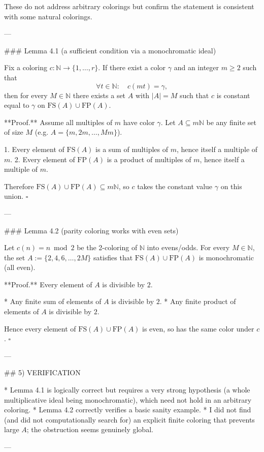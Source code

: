 These do not address arbitrary colorings but confirm the statement is consistent with some natural colorings.

---

### Lemma 4.1 (a sufficient condition via a monochromatic ideal)

Fix a coloring $c:\mathbb N\to\{1,\dots,r\}$.
If there exist a color $\gamma$ and an integer $m\ge 2$ such that
\[
\forall t\in\mathbb N:\quad c(mt)=\gamma,
\]
then for every $M\in\mathbb N$ there exists a set $A$ with $|A|=M$ such that $c$ is constant equal to $\gamma$ on $\mathrm{FS}(A)\cup\mathrm{FP}(A)$.

**Proof.**
Assume all multiples of $m$ have color $\gamma$.
Let $A\subseteq m\mathbb N$ be any finite set of size $M$ (e.g. $A=\{m,2m,\dots,Mm\}$).

1. Every element of $\mathrm{FS}(A)$ is a sum of multiples of $m$, hence itself a multiple of $m$.
2. Every element of $\mathrm{FP}(A)$ is a product of multiples of $m$, hence itself a multiple of $m$.

Therefore $\mathrm{FS}(A)\cup\mathrm{FP}(A)\subseteq m\mathbb N$, so $c$ takes the constant value $\gamma$ on this union.
$\square$

---

### Lemma 4.2 (parity coloring works with even sets)

Let $c(n)=n\bmod 2$ be the 2-coloring of $\mathbb N$ into evens/odds.
For every $M\in\mathbb N$, the set $A:=\{2,4,6,\dots,2M\}$ satisfies that $\mathrm{FS}(A)\cup\mathrm{FP}(A)$ is monochromatic (all even).

**Proof.**
Every element of $A$ is divisible by $2$.

* Any finite sum of elements of $A$ is divisible by $2$.
* Any finite product of elements of $A$ is divisible by $2$.

Hence every element of $\mathrm{FS}(A)\cup\mathrm{FP}(A)$ is even, so has the same color under $c$.
$\square$

---

## 5) VERIFICATION

* Lemma 4.1 is logically correct but requires a very strong hypothesis (a whole multiplicative ideal being monochromatic), which need not hold in an arbitrary coloring.
* Lemma 4.2 correctly verifies a basic sanity example.
* I did not find (and did not computationally search for) an explicit finite coloring that prevents large $A$; the obstruction seems genuinely global.

---

